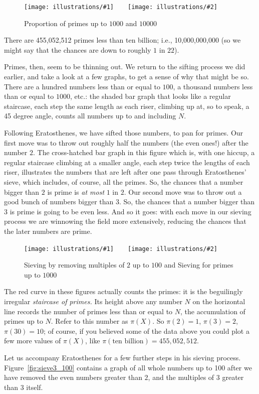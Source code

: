 \documentclass[11pt]{article}
\newcommand{\illtwo}[4]{ 
   \begin{figure}[H]
   \begin{center}
   \texttt{[image: illustrations/\#1]}$\qquad$\texttt{[image: illustrations/\#2]}
   \caption{#4}
    \end{center}
    \end{figure}
}
\theoremstyle{plain}
\theoremstyle{definition}
\numberwithin{equation}{section}
\numberwithin{figure}{section}
\numberwithin{table}{section}
\begin{document}
\illtwo{proportion_primes_1000}{proportion_primes_10000}{0.4}{Proportion of primes up to $1000$ and $10000$}

There are 455,052,512 primes less than ten billion; i.e.,
10,000,000,000 (so we might say that the chances are down to roughly
$1$ in $22$).

Primes, then, seem to be thinning out.  We return to the sifting process
we did earlier, and take a look at a few graphs, to get a sense of why
that might be so. There are a hundred numbers less than or equal to
$100$, a thousand numbers less than or equal to $1000$, etc.: the
shaded bar graph that looks like a regular staircase, each step the
same length as each riser, climbing up at, so to speak, a 45 degree
angle, counts all numbers up to and including $N$.

Following Eratosthenes, we have sifted those numbers, to pan for
primes. Our first move was to throw out roughly half the numbers (the
even ones!) after the number $2$. The cross-hatched bar graph in this
figure which is, with one hiccup, a regular staircase climbing at a
smaller angle, each step twice the lengths of each riser, illustrates
the numbers that are left after one pass through Eratosthenes' sieve,
which includes, of course, all the primes. So, the chances that a
number bigger than $2$ is prime is {\em at most} $1$ in $2$.  Our
second move was to throw out a good bunch of numbers bigger than $3$.
So, the chances that a number bigger than $3$ is prime is going to be
even less.  And so it goes: with each move in our
sieving process we are winnowing the field more extensively, reducing
the chances that the later numbers are prime.

\illtwo{sieve_2_200}{sieve1000}{.45}{Sieving by removing multiples of $2$ up to $100$ and Sieving for primes up to $1000$}
          
The red curve in these figures actually counts the primes: it is the
beguilingly irregular {\em staircase of primes.}  Its height above any
number $N$ on the horizontal line records the number of primes less
than or equal to $N$, the accumulation of primes up to $N$.  Refer to
this number as $\pi(X)$. So $\pi(2)=1$, $\pi(3) = 2$, $\pi(30) = 10$; of
course, if you believed some of the data above you could plot a few
more values of $\pi(X)$, like $\pi(\text{ten billion}) = 455,052,512$.
                              
                                 
Let us accompany Eratosthenes for a few further steps in his sieving
process.  Figure~\ref{fig:sieve3_100} contains a graph of all whole
numbers up to 100 after we have removed the even numbers greater than
$2$, and the multiples of $3$ greater than $3$ itself.
                                 
\end{document}
